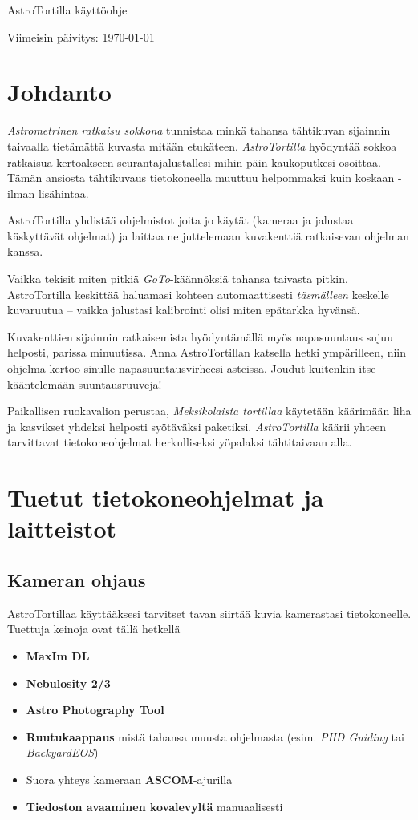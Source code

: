 \documentclass{article}
\begin{document}
\centerline{\sf \Huge AstroTortilla käyttöohje}
\centerline{Viimeisin päivitys: \today}

\tableofcontents

\setlength{\parindent}{0pt}
\setlength{\parskip}{2ex}

\newpage

\section{Johdanto}

\emph{Astrometrinen ratkaisu sokkona} tunnistaa minkä tahansa tähtikuvan 
sijainnin taivaalla tietämättä kuvasta mitään etukäteen. \emph{AstroTortilla} 
hyödyntää sokkoa ratkaisua kertoakseen seurantajalustallesi mihin päin kaukoputkesi
osoittaa. Tämän ansiosta tähtikuvaus tietokoneella muuttuu helpommaksi kuin koskaan - ilman lisähintaa.

AstroTortilla yhdistää ohjelmistot joita jo käytät (kameraa ja jalustaa käskyttävät ohjelmat) 
ja laittaa ne juttelemaan kuvakenttiä ratkaisevan ohjelman kanssa.

Vaikka tekisit miten pitkiä \emph{GoTo}-käännöksiä tahansa taivasta pitkin, 
AstroTortilla keskittää haluamasi kohteen automaattisesti \emph{täsmälleen} 
keskelle kuvaruutua -- vaikka jalustasi kalibrointi olisi miten epätarkka hyvänsä.

Kuvakenttien sijainnin ratkaisemista hyödyntämällä myös napasuuntaus sujuu helposti, parissa minuutissa.
Anna AstroTortillan katsella hetki ympärilleen, niin ohjelma kertoo sinulle napasuuntausvirheesi asteissa.
Joudut kuitenkin itse kääntelemään suuntausruuveja!

Paikallisen ruokavalion perustaa, \emph{Meksikolaista tortillaa} käytetään
käärimään liha ja kasvikset yhdeksi helposti syötäväksi paketiksi.
\emph{AstroTortilla} käärii yhteen tarvittavat tietokoneohjelmat herkulliseksi
yöpalaksi tähtitaivaan alla.
 

\section{Tuetut tietokoneohjelmat ja laitteistot} 
\subsection{Kameran ohjaus}

AstroTortillaa käyttääksesi tarvitset tavan siirtää kuvia kamerastasi tietokoneelle. Tuettuja keinoja ovat tällä hetkellä
\begin{itemize}
\item \textbf{{MaxIm DL}} 
\item \textbf{{Nebulosity 2/3}} 
\item \textbf{{Astro Photography Tool}} 
\item \textbf{{Ruutukaappaus}} mistä tahansa muusta ohjelmasta (esim. \emph{PHD Guiding} tai \emph{BackyardEOS})
\item Suora yhteys kameraan \textbf{ASCOM}-ajurilla
\item \textbf{Tiedoston avaaminen kovalevyltä} manuaalisesti
\end{itemize}
\end{document}
